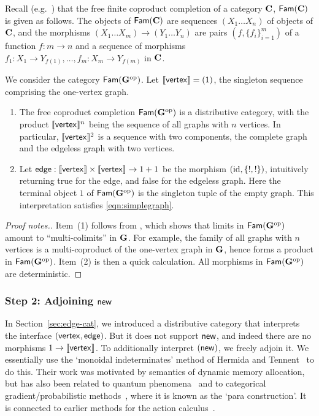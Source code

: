 Recall (e.g.~\cite{hu-tholen}) that the free finite coproduct completion of a category
$\mathbf{C}$, $\mathsf{Fam}(\mathbf{C})$ is given as follows. The objects of
$\mathsf{Fam}(\mathbf{C})$ are sequences
$(X_1\dots X_n)$ of objects of $\mathbf{C}$, and the morphisms
$(X_1\dots X_m)\to (Y_1\dots Y_n)$ are pairs $(f,\{f_i\}_{i=1}^m)$
of a function $f:m\to n$ and a sequence of morphisms ${f_1:X_{1}\to Y_{f(1)}},\dots, {f_m:X_{m} \to
Y_{f(m)}}$ in $\mathbf{C}$.  

We consider the category $\mathsf{Fam}(\mathbf{G}^\mathrm{op})$. Let $\llbracket \mathsf{vertex}\rrbracket=(1)$, the
singleton sequence comprising the one-vertex graph. 
\begin{proposition}\label{prop:FamG}
  \begin{enumerate}
  \item The free coproduct completion $\mathsf{Fam}(\mathbf{G}^\mathrm{op})$ is a distributive
    category, with the product $\llbracket \mathsf{vertex}\rrbracket^n$ being the sequence of all
    graphs with $n$ vertices.
    In particular, $\llbracket \mathsf{vertex}\rrbracket^2$ is a sequence with two components,
    the complete graph and the edgeless graph with two vertices. 
  \item Let $\mathsf{edge}: \llbracket \mathsf{vertex}\rrbracket\times \llbracket \mathsf{vertex}\rrbracket\to 1+1$
    be the morphism $(\mathrm{id},\{!,!\})$, intuitively returning true for
    the edge, and false for the edgeless graph. Here the terminal object $1$
    of $\mathsf{Fam}(\mathbf{G}^\mathrm{op})$ is the singleton tuple of the empty graph.
    This interpretation satisfies \eqref{eqn:simplegraph}. 
  \end{enumerate}
\end{proposition}
\begin{proof}[Proof notes.]
  Item~(1) follows from \cite{hu-tholen}, which shows that
  limits in $\mathsf{Fam}(\mathbf{G}^\mathrm{op})$ amount to ``multi-colimits'' in $\mathbf{G}$. 
  For example, the family of all graphs with $n$ vertices is a
  multi-coproduct of the one-vertex graph in $\mathbf{G}$,
  hence forms a product in $\mathsf{Fam}(\mathbf{G}^\mathrm{op})$.
  Item~(2) is then a quick calculation. All morphisms in $\mathsf{Fam}(\mathbf{G}^\mathrm{op})$ are deterministic. 
\end{proof}

\subsubsection{Step 2: Adjoining $\mathsf{new}$}
\newcommand{\CatHT}{\Fam(\CatG\op)[\nu]}

In Section~\ref{sec:edge-cat}, we introduced a distributive category
that interprets the interface $(\mathsf{vertex},\mathsf{edge})$.
But it does not support $\mathsf{new}$, and indeed there are no morphisms
$1\to\llbracket \mathsf{vertex}\rrbracket$. 
To additionally
interpret $(\mathsf{new})$, we freely adjoin it. We essentially use the `monoidal
indeterminates' method of Hermida and
Tennent~\cite{hermida-tennent} to do this.
Their work was motivated by semantics of dynamic memory allocation, but has also been
related to quantum phenomena~\cite{hs-quantum,ahk-partial-quantum} and to categorical gradient/probabilistic methods~\cite{para,backprop,Shiebler2021categorical}, where it is known as the `para construction'. It is connected to earlier methods for the action calculus~\cite{pavlovic_1997}.

